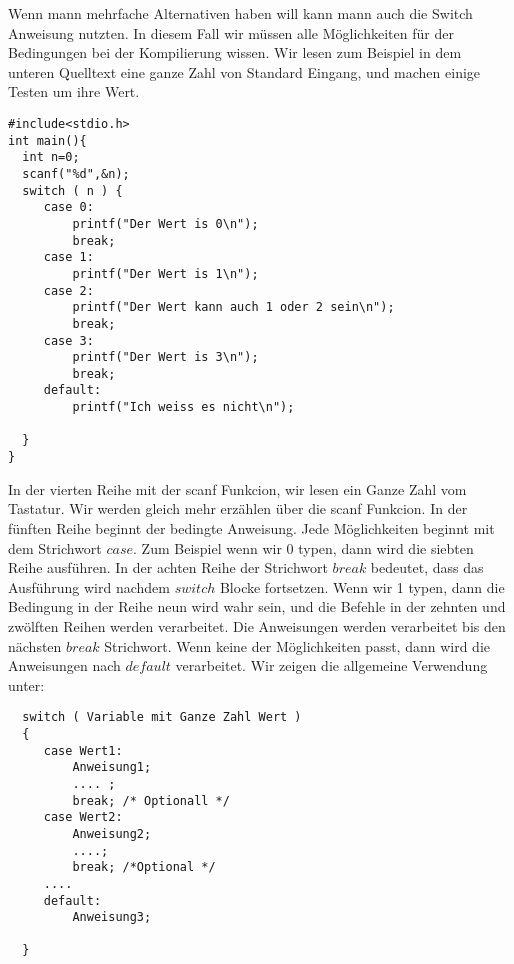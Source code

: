 Wenn mann mehrfache Alternativen haben will kann mann auch die Switch Anweisung nutzten. In diesem Fall wir müssen 
alle Möglichkeiten für der Bedingungen bei der Kompilierung wissen. Wir lesen zum Beispiel in dem unteren Quelltext eine
ganze Zahl von Standard Eingang, und machen einige Testen um ihre Wert.
\begin{lstlisting}
#include<stdio.h>
int main(){
  int n=0;
  scanf("%d",&n);
  switch ( n ) {
     case 0: 
         printf("Der Wert is 0\n");
         break;
     case 1:
         printf("Der Wert is 1\n");
     case 2:
         printf("Der Wert kann auch 1 oder 2 sein\n");
         break;
     case 3:
         printf("Der Wert is 3\n");
         break;
     default:
         printf("Ich weiss es nicht\n");
     
  }
}
\end{lstlisting}
In der vierten Reihe mit der scanf Funkcion, wir lesen ein Ganze Zahl vom Tastatur. Wir werden gleich mehr erzählen über die
scanf Funkcion. In der fünften Reihe beginnt der bedingte Anweisung. Jede Möglichkeiten beginnt mit dem Strichwort $case$.
Zum Beispiel wenn wir 0 typen, dann wird die siebten Reihe ausführen. In der achten Reihe der Strichwort $break$ bedeutet, dass
das Ausführung wird nachdem $switch$ Blocke fortsetzen. Wenn wir 1 typen, dann die Bedingung in der Reihe neun wird wahr sein, und
die Befehle in der zehnten und zwölften Reihen werden verarbeitet. Die Anweisungen werden verarbeitet bis den nächsten $break$ 
Strichwort. Wenn keine der Möglichkeiten passt, dann wird die Anweisungen nach $default$ verarbeitet.  Wir zeigen die allgemeine
Verwendung unter:

\begin{lstlisting}
  switch ( Variable mit Ganze Zahl Wert )
  {
     case Wert1:
         Anweisung1;
         .... ;
         break; /* Optionall */
     case Wert2:
         Anweisung2;
         ....; 
         break; /*Optional */
     ....
     default:
         Anweisung3;

  }
\end{lstlisting}

